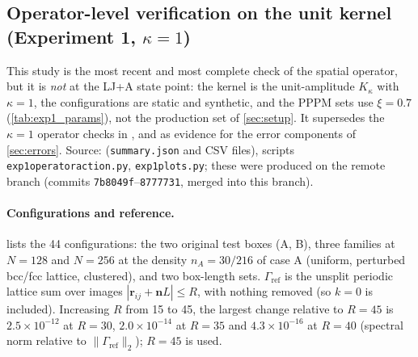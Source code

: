 \documentclass[11pt]{article}
\DeclareRobustCommand{\_}{\textunderscore\allowbreak}
\theoremstyle{remark}
\theoremstyle{definition}
\newcommand{\br}{\mathbf{r}}
\newcommand{\bn}{\mathbf{n}}
\newcommand{\Gref}{\Gamma_{\mathrm{ref}}}
\begin{document}
\clearpage
\subsection{Operator-level verification on the unit kernel (Experiment 1, \texorpdfstring{$\kappa=1$}{kappa = 1})}\label{app:exp1}

This study is the most recent and most complete check of the spatial operator, but it is \emph{not} at the LJ+A state
point: the kernel is the unit-amplitude $K_\kappa$ with $\kappa=1$, the configurations are static and synthetic, and the
PPPM sets use $\xi=0.7$ (\cref{tab:exp1_params}), not the production set of \cref{sec:setup}. It supersedes the $\kappa=1$
operator checks in ,  and  as
evidence for the error components of \cref{sec:errors}. Source:  (\texttt{summary.json} and CSV files),
scripts \texttt{exp1\_operator\_action.py}, \texttt{exp1\_plots.py}; these were produced on the remote
branch (commits \texttt{7b8049f}--\texttt{8777731}, merged into this branch).

\paragraph{Configurations and reference.}
 lists the 44 configurations: the two original test boxes (A, B), three families at $N=128$ and
$N=256$ at the density $n_A=30/216$ of case A (uniform, perturbed bcc/fcc lattice, clustered), and two box-length sets.
$\Gref$ is the unsplit periodic lattice sum over images $|\br_{ij}+\bn L|\le R$, with nothing removed (so $k=0$ is included).
Increasing $R$ from 15 to 45, the largest change relative to $R=45$ is $2.5\times10^{-12}$ at $R=30$, $2.0\times10^{-14}$ at
$R=35$ and $4.3\times10^{-16}$ at $R=40$ (spectral norm relative to $\|\Gref\|_2$); $R=45$ is used.
\end{document}

